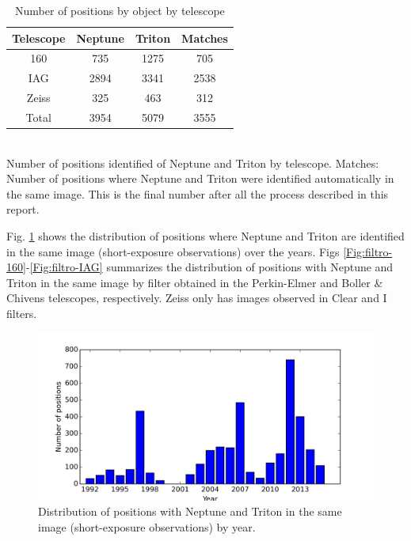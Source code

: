 \documentclass[12pt,a4paper]{report}
\newcommand{\PE}{Perkin-Elmer }
\newcommand{\BC}{Boller \& Chivens }
\begin{document}
\begin{table}[h]
\centering
\caption{Number of positions by object by telescope}
\label{Tab:dados}
\begin{tabular}{|c|c|c|c|}
\hline 
Telescope & Neptune & Triton & Matches \\ 
\hline
160 & 735 & 1275 & 705 \\
\hline
IAG & 2894 & 3341 & 2538 \\ 
\hline 
Zeiss & 325 & 463 & 312 \\ 
\hline 
Total & 3954 & 5079 & 3555 \\ 
\hline 
\end{tabular}
\\Number of positions identified of Neptune and Triton by telescope. Matches: Number of positions where Neptune and Triton were identified automatically in the same image. This is the final number after all the process described in this report.
\end{table}



Fig. \ref{Fig:pos-dist} shows the distribution of positions where Neptune and Triton are identified in the same image (short-exposure observations) over the years. Figs \ref{Fig:filtro-160}-\ref{Fig:filtro-IAG} summarizes the distribution of positions with Neptune and Triton in the same image by filter obtained in the \PE and \BC telescopes, respectively. Zeiss only has images observed in Clear and I filters.

\begin{figure}
\includegraphics[width=16.0cm]{pos-distribution.png} 
\caption{Distribution of positions with Neptune and Triton in the same image (short-exposure observations) by year.}
\label{Fig:pos-dist}
\end{figure}
\end{document}
